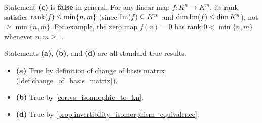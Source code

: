 \begin{exercisesolution*}
\label{sol:linear_maps_and_base_changes_sc}
Statement \textbf{(c)} is \textbf{false} in general.
For any linear map $f \colon K^n \to K^m$, its rank satisfies $\operatorname{rank}(f) \le \min\{n, m\}$ (since $\operatorname{Im}(f) \subseteq K^m$ and $\dim \operatorname{Im}(f) \le \dim K^n$), not $\ge \min\{n, m\}$. For example, the zero map $f(v) = 0$ has rank $0 < \min\{n, m\}$ whenever $n, m \ge 1$.

Statements \textbf{(a)}, \textbf{(b)}, and \textbf{(d)} are all standard true results:
\begin{itemize}
    \item \textbf{(a)} True by definition of change of basis matrix (\cref{def:change_of_basis_matrix}).
    \item \textbf{(b)} True by \cref{cor:vs_isomorphic_to_kn}.
    \item \textbf{(d)} True by \cref{prop:invertibility_isomorphism_equivalence}.
\end{itemize}
\end{exercisesolution*}
